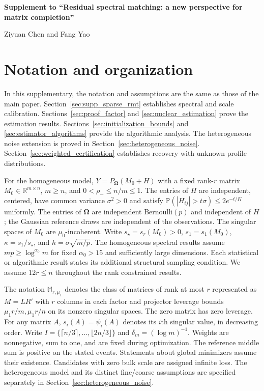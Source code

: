 \documentclass[numsec,webpdf,modern,large,namedate]{oup-authoring-template}
\theoremstyle{plain}
\theoremstyle{remark}
\newcommand{\bOmega}{\bm{\Omega}}
\newif\ifmarkchanges
\newenvironment{revision}{\begingroup\ifmarkchanges\color{red}\fi}{\endgroup}
\begin{document}
\raggedbottom
\vspace*{8pt}

\bigskip
\bigskip
\bigskip
\begin{center}
{\LARGE\bfseries Supplement to ``Residual spectral matching: a new perspective for matrix completion''}
\end{center}
\begin{center}
Ziyuan Chen and Fang Yao
\end{center}

\begin{revision}
\section{Notation and organization}
In this supplementary, the notation and assumptions are the same as those of the main paper. Section~\ref{sec:supp_sparse_rmt} establishes spectral and scale calibration. Sections~\ref{sec:proof_factor} and \ref{sec:nuclear_estimation} prove the estimation results. Sections~\ref{sec:initialization_bounds} and \ref{sec:estimator_algorithms} provide the algorithmic analysis. The heterogeneous noise extension is proved in Section~\ref{sec:heterogeneous_noise}. Section~\ref{sec:weighted_certification} establishes recovery with unknown profile distributions.

For the homogeneous model, $Y=P_{\bOmega}(M_0+H)$ with a fixed rank-$r$ matrix $M_0\in\mathbb R^{m\times n}$, $m\ge n$, and $0<\rho_-\le n/m\le1$.  The entries of $H$ are independent, centered, have common variance $\sigma^2>0$ and satisfy $\mathbb P(|H_{ij}|>t\sigma)\le2e^{-t/K}$ uniformly. The entries of $\bOmega$ are independent Bernoulli$(p)$ and independent of $H$; the Gaussian reference draws are independent of the observations. The singular spaces of $M_0$ are $\mu_0$-incoherent. Write $s_\star=s_r(M_0)>0$, $s_1=s_1(M_0)$, $\kappa=s_1/s_\star$, and $h=\sigma\sqrt{m/p}$.
The homogeneous spectral results assume $mp\ge\log^{\alpha_0}m$ for fixed $\alpha_0>15$ and sufficiently large dimensions. Each statistical or algorithmic result states its additional structural sampling condition. We assume $12r\le n$ throughout the rank constrained results.

The notation $\mathbb M_{r,\mu_1}$ denotes the class of matrices of rank at most $r$ represented as $M=LR'$ with $r$ columns in each factor and projector leverage bounds $\mu_1r/m,\mu_1r/n$ on its nonzero singular spaces. The zero matrix has zero leverage. For any matrix $A$, $s_i(A)=\psi_i(A)$ denotes its $i$th singular value, in decreasing order. Write $I=\{\lceil n/3\rceil,\ldots,\lfloor2n/3\rfloor\}$ and
$\delta_m=(\log m)^{-1}$. Weights are nonnegative, sum to one, and are fixed during optimization. The reference middle sum is positive on the stated events. Statements about global minimizers assume their existence. Candidates with zero bulk scale are assigned infinite loss. The heterogeneous model and its distinct fine/coarse assumptions are specified separately in Section~\ref{sec:heterogeneous_noise}.
\end{revision}
\end{document}
